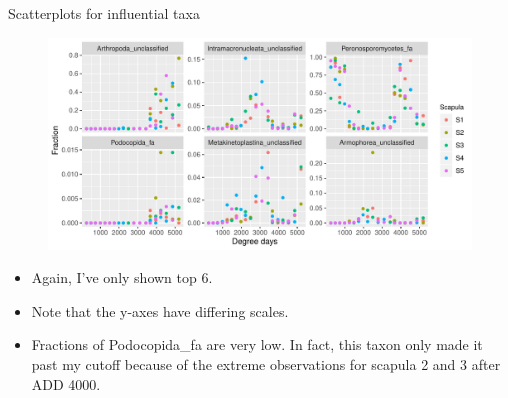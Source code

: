 \documentclass{beamer}
\begin{document}
\begin{frame}{Scatterplots for influential taxa}

  \begin{center}
    \begin{figure}
      \includegraphics[width=4.75in]{w_scapulae/infl_scapula_family_scatter}
    \end{figure}
  \end{center}
  \vspace{-0.25in}
  {\scriptsize
  \begin{itemize}
  \item Again, I've only shown top 6.
  \item Note that the y-axes have differing scales.
  \item Fractions of Podocopida\_fa are very low.  In fact, this taxon
    only made it past my cutoff because of the extreme observations
    for scapula 2 and 3 after ADD 4000.
  \end{itemize}
  }

\end{frame}
\end{document}
